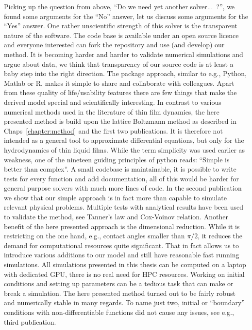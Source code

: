 Picking up the question from above, ``Do we need yet another solver...~?'', we found some arguments for the ``No'' answer, let us discuss some arguments for the ``Yes'' answer.
One rather unscientific strength of this solver is the transparent nature of the software. 
The code base is available under an open source licence and everyone interested can fork the repository and use (and develop) our method.
It is becoming harder and harder to validate numerical simulations and argue about data, we think that transparency of our source code is at least a baby step into the right direction. 
The package approach, similar to e.g., Python, Matlab or R, makes it simple to share and collaborate with colleagues.
Apart from these quality of life/usability features there are few things that make the derived model special and scientifically interesting.
In contrast to various numerical methods used in the literature of thin film dynamics, the here presented method is build upon the lattice Boltzmann method as described in Chaps~\ref{chapter:method} and the first two publications.
It is therefore not intended as a general tool to approximate differential equations, but only for the hydrodynamics of thin liquid films.
While the term simplicity was used earlier as weakness, one of the nineteen guiding principles of python reads: ``Simple is better than complex''.
A small codebase is maintainable, it is possible to write tests for every function and add documentation, all of this would be harder for general purpose solvers with much more lines of code.
In the second publication we show that our simple approach is in fact more than capable to simulate relevant physical problems.
Multiple tests with analytical results have been used to validate the method, see Tanner's law and Cox-Voinov relation.
Another benefit of the here presented approach is the dimensional reduction.
While it is restricting on the one hand, e.g., contact angles smaller than $\pi/2$, it reduces the demand for computational resources quite significant.
That in fact allows us to introduce various additions to our model and still have reasonable fast running simulations.
All simulations presented in this thesis can be computed on a laptop with dedicated GPU, there is no real need for HPC resources.
Working on initial conditions and setting up parameters can be a tedious task that can make or break a simulation.
The here presented method turned out to be fairly robust and numerically stable in many regards.
To name just two, initial or ``boundary'' conditions with non-differentiable functions did not cause any issues, see e.g.,  third publication.
